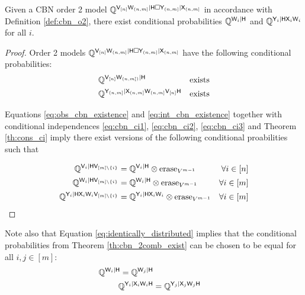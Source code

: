 \begin{theorem}\label{th:cbn_2comb_exist}
Given a CBN order 2 model $\mathbb{Q}^{\mathsf{V}_{[n]}\mathsf{W}_{(n,m]}|\mathsf{H}\square \mathsf{Y}_{(n,m]}|\mathsf{X}_{(n,m]}}$ in accordance with Definition \ref{def:cbn_o2}, there exist conditional probabilities $\mathbb{Q}^{\mathsf{W}_i|\mathsf{H}}$ and $\mathbb{Q}^{\mathsf{Y}_i|\mathsf{H}\mathsf{X}_i\mathsf{W}_i}$ for all $i$.
\end{theorem}

\begin{proof}
Order 2 models $\mathbb{Q}^{\mathsf{V}_{[n]}\mathsf{W}_{(n,m]}|\mathsf{H}\square \mathsf{Y}_{(n,m]}|\mathsf{X}_{(n,m]}}$ have the following conditional probabilities:
\begin{align}
   & \mathbb{Q}^{\mathsf{V}_{[n]}\mathsf{W}_{(n,m])}|\mathsf{H}}&\text{exists}\label{eq:obs_cbn_existence}\\
   & \mathbb{Q}^{\mathsf{Y}_{(n,m]}|\mathsf{X}_{(n,m]}\mathsf{W}_{(n,m]}\mathsf{V}_{[n]}\mathsf{H}}&\text{exists}\label{eq:int_cbn_existence}
\end{align}

Equations \ref{eq:obs_cbn_existence} and \ref{eq:int_cbn_existence} together with conditional independences \ref{eq:cbn_ci1}, \ref{eq:cbn_ci2}, \ref{eq:cbn_ci3} and Theorem \ref{th:cons_ci} imply there exist versions of the following conditional proabilities such that

\begin{align}
    \mathbb{Q}^{\mathsf{V}_i|\mathsf{H}\mathsf{V}_{[m]\setminus\{i\}}}&=\mathbb{Q}^{\mathsf{V}_i|\mathsf{H}}\otimes \text{erase}_{V^{m-1}} & \forall i\in[n]\\
    \mathbb{Q}^{\mathsf{W}_i|\mathsf{H}\mathsf{V}_{[m]\setminus\{i\}}}&=\mathbb{Q}^{\mathsf{W}_i|\mathsf{H}}\otimes \text{erase}_{V^{m-1}} & \forall i\in[m]\\
    \mathbb{Q}^{\mathsf{Y}_i|\mathsf{H}\mathsf{X}_i\mathsf{W}_i\mathsf{V}_{[m]\setminus\{i\}}}&= \mathbb{Q}^{\mathsf{Y}_i|\mathsf{H}\mathsf{X}_i\mathsf{W}_i}\otimes \text{erase}_{V^{m-1}} & \forall i\in [m]
\end{align}
\end{proof}

Note also that Equation \ref{eq:identically_distributed} implies that the conditional probabilities from Theorem \ref{th:cbn_2comb_exist} can be chosen to be equal for all $i,j\in [m]$:
\begin{align}
    \mathbb{Q}^{\mathsf{W}_i|\mathsf{H}} = \mathbb{Q}^{\mathsf{W}_j|\mathsf{H}}\label{eq:identical_1}\\
    \mathbb{Q}^{\mathsf{Y}_i|\mathsf{X}_i\mathsf{W}_i\mathsf{H}} &= \mathbb{Q}^{\mathsf{Y}_j|\mathsf{X}_j\mathsf{W}_j\mathsf{H}}\label{eq:identical_2}
\end{align}

